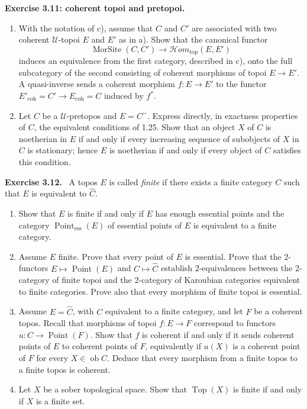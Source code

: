 \documentclass[11pt]{article}
\newcommand{\U}{\mathcal{U}}
\newcommand{\Top}{\operatorname{Top}}
\newcommand{\ob}{\operatorname{ob}}
\newcommand{\Ppoint}{\operatorname{Point}}
\newcommand{\Ppointess}{\operatorname{Point}_{\mathrm{ess}}}
\newcommand{\coh}{\mathrm{coh}}
\newenvironment{remarktext}[1]{\par\medskip\noindent\textbf{#1.}\ }{\par\medskip}
\begin{document}
\begin{remarktext}{Exercise 3.11: coherent topoi and pretopoi}
\begin{enumerate}[label=\alph*)]
\item With the notation of c), assume that \(C\) and \(C'\) are associated with two coherent \(\U\)-topoi \(E\) and \(E'\) as in a). Show that the canonical functor
\[
 \operatorname{MorSite}(C,C')\to \mathcal{H}om_{\mathrm{top}}(E,E')
\]
induces an equivalence from the first category, described in c), onto the full subcategory of the second consisting of coherent morphisms of topoi \(E\to E'\). A quasi-inverse sends a coherent morphism \(f:E\to E'\) to the functor \(E'_{\coh}=C'\to E_{\coh}=C\) induced by \(f^*\).

\item Let \(C\) be a \(\U\)-pretopos and \(E=C^{\sim}\). Express directly, in exactness properties of \(C\), the equivalent conditions of 1.25. Show that an object \(X\) of \(C\) is noetherian in \(E\) if and only if every increasing sequence of subobjects of \(X\) in \(C\) is stationary; hence \(E\) is noetherian if and only if every object of \(C\) satisfies this condition.
\end{enumerate}
\end{remarktext}

\begin{remarktext}{Exercise 3.12}
A topos \(E\) is called \emph{finite} if there exists a finite category \(C\) such that \(E\) is equivalent to \(\widehat C\).
\begin{enumerate}[label=\alph*)]
\item Show that \(E\) is finite if and only if \(E\) has enough essential points and the category \(\Ppointess(E)\) of essential points of \(E\) is equivalent to a finite category.
\item Assume \(E\) finite. Prove that every point of \(E\) is essential. Prove that the 2-functors \(E\mapsto\Ppoint(E)\) and \(C\mapsto\widehat C\) establish 2-equivalences between the 2-category of finite topoi and the 2-category of Karoubian categories equivalent to finite categories. Prove also that every morphism of finite topoi is essential.
\item Assume \(E=\widehat C\), with \(C\) equivalent to a finite category, and let \(F\) be a coherent topos. Recall that morphisms of topoi \(f:E\to F\) correspond to functors \(u:C\to \Ppoint(F)\). Show that \(f\) is coherent if and only if it sends coherent points of \(E\) to coherent points of \(F\), equivalently if \(u(X)\) is a coherent point of \(F\) for every \(X\in\ob C\). Deduce that every morphism from a finite topos to a finite topos is coherent.
\item Let \(X\) be a sober topological space. Show that \(\Top(X)\) is finite if and only if \(X\) is a finite set.
\end{enumerate}
\end{remarktext}
\end{document}
